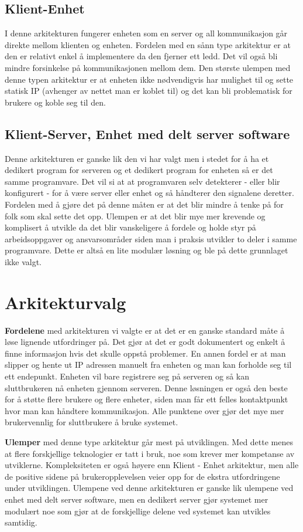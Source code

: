 \documentclass[12pt]{report}
\begin{document}
\subsection{Klient-Enhet}
I denne arkitekturen fungerer enheten som en server og all kommunikasjon går direkte mellom klienten og enheten. Fordelen med en sånn type arkitektur er at den er relativt enkel å implementere da den fjerner ett ledd. Det vil også bli mindre forsinkelse på kommunikasjonen mellom dem. Den største ulempen med denne typen arkitektur er at enheten ikke nødvendigvis har mulighet til og sette statisk IP (avhenger av nettet man er koblet til) og det kan bli problematisk for brukere og koble seg til den.

\subsection{Klient-Server, Enhet med delt server software}
Denne arkitekturen er ganske lik den vi har valgt men i stedet for å ha et dedikert program for serveren og et dedikert program for enheten så er det samme programvare. Det vil si at at programvaren selv detekterer - eller blir konfigurert - for å være server eller enhet og så håndterer den signalene deretter. Fordelen med å gjøre det på denne måten er at det blir mindre å tenke på for folk som skal sette det opp. Ulempen er at det blir mye mer krevende og komplisert å utvikle da det blir vanskeligere å fordele og holde styr på arbeidsoppgaver og ansvarsområder siden man i praksis utvikler to deler i samme programvare. Dette er altså en lite modulær løsning og ble på dette grunnlaget ikke valgt.

\section{Arkitekturvalg}
\textbf{Fordelene} med arkitekturen vi valgte er at det er en ganske standard måte å løse lignende utfordringer på. Det gjør at det er godt dokumentert og enkelt å finne informasjon hvis det skulle oppstå problemer. En annen fordel er at man slipper og hente ut IP adressen manuelt fra enheten og man kan forholde seg til ett endepunkt. Enheten vil bare registrere seg på serveren og så kan sluttbrukeren nå enheten gjennom serveren. Denne løsningen er også den beste for å støtte flere brukere og flere enheter, siden man får ett felles kontaktpunkt hvor man kan håndtere kommunikasjon. Alle punktene over gjør det mye mer brukervennlig for sluttbrukere å bruke systemet.

\textbf{Ulemper} med denne type arkitektur går mest på utviklingen. Med dette menes at flere forskjellige teknologier er tatt i bruk, noe som krever mer kompetanse av utviklerne. Kompleksiteten er også høyere enn Klient - Enhet arkitektur, men alle de positive sidene på brukeropplevelsen veier opp for de ekstra utfordringene under utviklingen. Ulempene ved denne arkitekturen er ganske lik ulempene ved enhet med delt server software, men en dedikert server gjør systemet mer modulært noe som gjør at de forskjellige delene ved systemet kan utvikles samtidig.
\end{document}
